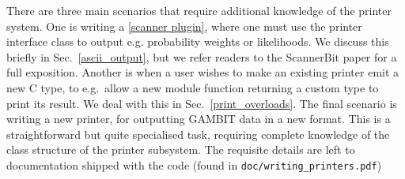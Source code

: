 \documentclass[pdftex,twocolumn,epjc3_preprint,runningheads]{svjour3}
\renewcommand{\_}{\discretionary{\underscore}{}{\underscore}}
\newcommand\term[1]{{\lstset{style=terminal}\lstinline!#1!\lstset{style=cpp}}}
\newcommand{\cross}[1]{\ref{#1}}
\newcommand{\gambit}{\textsf{GAMBIT}\xspace}
\newcommand{\scannerbit}{\textsf{ScannerBit}\xspace}
\newcommand{\GB}{\gambit}
\newcommand\xx{\raisebox{0.2ex}{\smaller ++}\xspace}
\newcommand\Cpp{\textsf{C\xx}\xspace}
\begin{document}
There are three main scenarios that require additional knowledge of the printer system. One is writing a \cross{scanner plugin}, where one must use the printer interface class to output e.g. probability weights or likelihoods. We discuss this briefly in Sec.\  \ref{ascii_output}, but we refer readers to the \scannerbit paper \cite{ScannerBit} for a full exposition.  Another is when a user wishes to make an existing printer emit a new \Cpp type, to e.g.\ allow a new module function returning a custom type to print its result. We deal with this in Sec.\ \ref{print_overloads}.  The final scenario is writing a new printer, for outputting \GB data in a new format. This is a straightforward but quite specialised task, requiring complete knowledge of the class structure of the printer subsystem. The requisite details are left to documentation shipped with the code (found in \term{doc/writing_printers.pdf})
\end{document}
